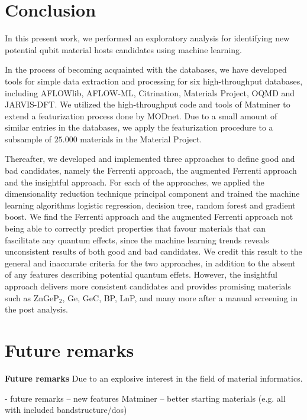 \chapter{Conclusion}

In this present work, we performed an exploratory analysis for identifying new potential qubit material hosts candidates using machine learning.

In the process of becoming acquainted with the databases, we have developed tools for simple data extraction and processing for six high-throughput databases, including AFLOWlib, AFLOW-ML, Citrination, Materials Project, OQMD and JARVIS-DFT. We utilized the high-throughput code and tools of Matminer to extend a featurization process done by MODnet. Due to a small amount of similar entries in the databases, we apply the featurization procedure to a subsample of $25.000$ materials in the Material Project.

Thereafter, we developed and implemented three approaches to define good and bad candidates, namely the Ferrenti approach, the augmented Ferrenti approach and the insightful approach. For each of the approaches, we applied the dimensionality reduction technique principal component and trained the machine learning algorithms logistic regression, decision tree, random forest and gradient boost. We find the Ferrenti approach and the augmented Ferrenti approach not being able to correctly predict properties that favour materials that can fascilitate any quantum effects, since the machine learning trends reveals unconsistent results of both good and bad candidates. We credit this result to the general and inaccurate criteria for the two approaches, in addition to the absent of any features describing potential quantum effets. However, the insightful approach delivers more consistent candidates and provides promising materials such as ZnGeP$_2$, Ge, GeC, BP, LnP, and many more after a manual screening in the post analysis. 

\chapter{Future remarks}



\textbf{Future remarks}
Due to an explosive interest in the field of material informatics.

- future remarks
-- new features Matminer
-- better starting materials (e.g. all with included bandstructure/dos)
